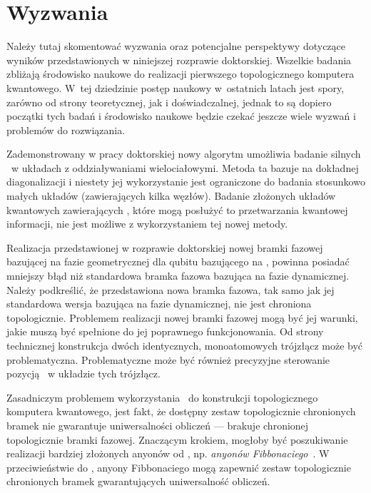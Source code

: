 \ornament

\section*{Wyzwania}

Należy tutaj skomentować wyzwania oraz potencjalne perspektywy dotyczące wyników przedstawionych w niniejszej rozprawie doktorskiej.
Wszelkie badania zbliżają środowisko naukowe do realizacji pierwszego topologicznego komputera kwantowego. 
W~tej dziedzinie postęp naukowy  w~ostatnich latach jest spory, zarówno od strony teoretycznej, jak i doświadczalnej, jednak to są dopiero początki tych badań i  środowisko naukowe będzie czekać jeszcze wiele wyzwań i problemów do rozwiązania.

Zademonstrowany w pracy doktorskiej nowy algorytm umożliwia badanie silnych \MZM\ w układach z oddziaływaniami wielociałowymi.
Metoda ta bazuje na dokładnej diagonalizacji i niestety jej wykorzystanie jest ograniczone do badania stosunkowo małych układów (zawierających kilka węzłów).
Badanie złożonych układów kwantowych zawierających \MZM, które mogą posłużyć to przetwarzania kwantowej informacji, nie jest możliwe z wykorzystaniem tej nowej metody.

Realizacja przedstawionej w rozprawie doktorskiej nowej bramki fazowej bazującej na fazie geometrycznej dla qubitu bazującego na \MZM, powinna posiadać mniejszy błąd niż standardowa bramka fazowa bazująca na fazie dynamicznej.
Należy podkreślić, że przedstawiona nowa bramka fazowa, tak samo jak jej standardowa wersja bazująca na fazie dynamicznej, nie jest chroniona topologicznie.
Problemem realizacji nowej bramki fazowej mogą być jej warunki, jakie muszą być spełnione do jej poprawnego funkcjonowania.
Od strony technicznej konstrukcja dwóch identycznych, monoatomowych trójzłącz może być problematyczna.
Problematyczne może być również precyzyjne sterowanie pozycją \MZM\ w układzie tych trójzłącz.

Zasadniczym problemem wykorzystania \MZM\ do konstrukcji topologicznego komputera kwantowego, jest fakt, że dostępny zestaw topologicznie chronionych bramek nie gwarantuje uniwersalności obliczeń --- brakuje chronionej topologicznie bramki fazowej.
Znaczącym krokiem, mogłoby być poszukiwanie realizacji bardziej złożonych anyonów od \MZM, np. \textit{anyonów Fibbonaciego}~\cite{bonesteel.hormozi.2005,trebst.troyer.2008,nayak.simon.2008}.
W przeciwieństwie do \MZM, anyony Fibbonaciego mogą zapewnić zestaw topologicznie chronionych bramek gwarantujących uniwersalność obliczeń.


\ornament